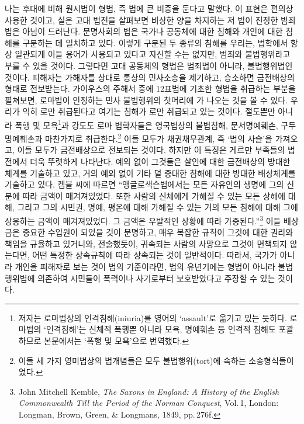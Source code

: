 나는 후대에 비해 원시법이 형법,
즉 법에
큰 비중을 둔다고 말했다.
이 표현은 편의상 사용한 것이고,
실은
고대 법전을 살펴보면
비상한 양을 차지하는 저 법이
진정한 범죄법은 아님이 드러난다.
문명사회의 법은
국가나 공동체에 대한 침해와
개인에 대한 침해를 구분하는 데 일치하고 있다.
이렇게 구분된 두 종류의 침해를 우리는,
법학에서 항상 일관되게 이들 용어가 사용되고 있다고 자신할 수는 없지만,
범죄와
불법행위라고
부를 수 있을 것이다.
그렇다면 고대 공동체의 형법은
범죄법이 아니라,
불법행위법인 것이다.
피해자는 가해자를 상대로 통상의 민사소송을 제기하고,
승소하면 금전배상의 형태로 전보받는다.
가이우스의 주해서 중에
12표법에 기초한 형법을 취급하는 부분을 펼쳐보면,
로마법이 인정하는 민사 불법행위의 첫머리에
가 나오는 것을 볼 수 있다.
우리가 익히 로만 취급된다고 여기는 침해가
로만 취급되고 있는 것이다.
절도뿐만 아니라
폭행 및 모욕\footnote{%
  저자는 로마법상의 인격침해(iniuria)를 영어의 `assault'로 옮기고 있는 듯하다.
  로마법의 `인격침해'는 신체적 폭행뿐 아니라
  모욕, 명예훼손 등 인격적 침해도
  포괄하므로 본문에서는 `폭행 및 모욕'으로 번역했다.
}과 강도도
로마 법학자들은 영국법상의 불법침해,
문서명예훼손, 구두명예훼손과
마찬가지로 취급한다.\footnote{%
  이들 세 가지 영미법상의 법개념들은 모두
  불법행위(tort)에 속하는 소송형식들이었다.}
이들 모두가 채권채무관계, 즉 `법의 사슬'을
가져오고, 이들 모두가 금전배상으로 전보되는 것이다.
하지만 이 특징은 게르만 부족들의 법전에서 더욱 뚜렷하게 나타난다.
예외 없이 그것들은
살인에 대한 금전배상의 방대한 체계를 기술하고 있고,
거의 예외 없이
기타 덜 중대한 침해에 대한 방대한 배상체계를 기술하고 있다.
켐블 씨에 따르면
``앵글로색슨법에서는 
모든 자유인의 생명에 그의 신분에 따라 금액이 매겨져있었다.
또한 사람의 신체에게 가해질 수 있는 모든 상해에 대해,
그리고 그의 시민권, 명예, 평온에 대해 가해질 수 있는 거의 모든 침해에 대해
그에 상응하는 금액이 매겨져있었다.
그 금액은 우발적인 상황에 따라 가중된다.''\footnote{%
  \latinmarks
  John Mitchell Kemble,
  \textit{The Saxons in England: A History of the English Commonwealth
  Till the Period of the Norman Conquest},
  Vol.\,1,
  London: Longman, Brown, Green, \& Longmans, 1849,
  pp.\,276f.}
이들 배상금은 중요한 수입원이 되었을 것이 분명하고,
매우 복잡한 규칙이 그것에 대한 권리와 책임을 규율하고 있거니와,
전술했듯이, 귀속되는 사람의 사망으로 그것이 면책되지 않는다면,
어떤 특정한 상속규칙에 따라 상속되는 것이 일반적이다.
따라서,
국가가 아니라 개인을 피해자로 보는 것이
법의 기준이라면,
법의 유년기에는
형법이 아니라
불법행위법에 의존하여
시민들이
폭력이나 사기로부터 보호받았다고 주장할 수 있는 것이다.

